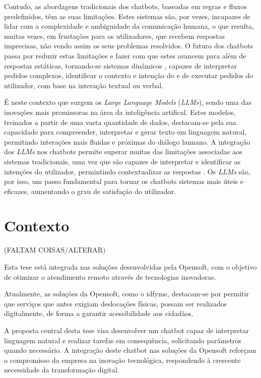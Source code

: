 Contudo, as abordagens tradicionais dos chatbots, baseadas em regras e fluxos predefinidos, têm as suas limitações. 
Estes sistemas são, por vezes, incapazes de lidar com a complexidade e ambiguidade da comunicação humana, o que resulta, muitas vezes, em frustações para os utilizadores, 
que recebem respostas imprecisas, não vendo assim os seus problemas resolvidos.
O futuro dos chatbots passa por reduzir estas limitações e fazer com que estes avancem para além de respostas estáticas, tornando-se sistemas dinâmicos \cite{Avyay}, 
capazes de interpretar pedidos complexos,
identificar o contexto e intenção do e de executar pedidos do utilizador, com base na interação textual ou verbal.

É neste contexto que surgem os \textit{Large Language Models} (\textit{LLMs}), sendo uma das inovações mais promissoras na área da inteligência artifical. 
Estes modelos, treinados a partir de uma vasta quantidade de dados, destacam-se pela sua capacidade para compreender, interpretar e gerar texto em linguagem natural, 
permitindo interações mais fluidas e próximas do diálogo humano. A integração dos \textit{LLMs} nos chatbots permite superar muitas das limitações associadas aos sistemas
tradicionais, uma vez que são capazes de interpretar e identificar as intenções do utilizador, permintindo contextualizar as respostas \cite{Sumit}.
Os \textit{LLMs} são, por isso, um passo fundamental para tornar os chatbots sistemas mais úteis e eficazes, aumentando o grau de satisfação do utilizador.

\section{Contexto}
\label{sec:context}

(FALTAM COISAS/ALTERAR)

Esta tese está integrada nas soluções desenvolvidas pela Opensoft, com o objetivo de otimizar o atendimento remoto através de tecnologias inovadoras. 

Atualmente, as soluções da Opensoft, como o idfyme, destacam-se por permitir que serviços que antes exigiam deslocações físicas, possam ser realizados digitalmente,
de forma a garantir acessibilidade aos cidadãos.

A proposta central desta tese visa desenvolver um chatbot capaz de interpretar linguagem natural e realizar tarefas em consequência, solicitando parâmetros quando necessário.
A integração deste chatbot nas soluções da Opensoft reforçam o compromisso da empresa na inovação tecnológica, respondendo à crescente necessidade da transformação digital.


